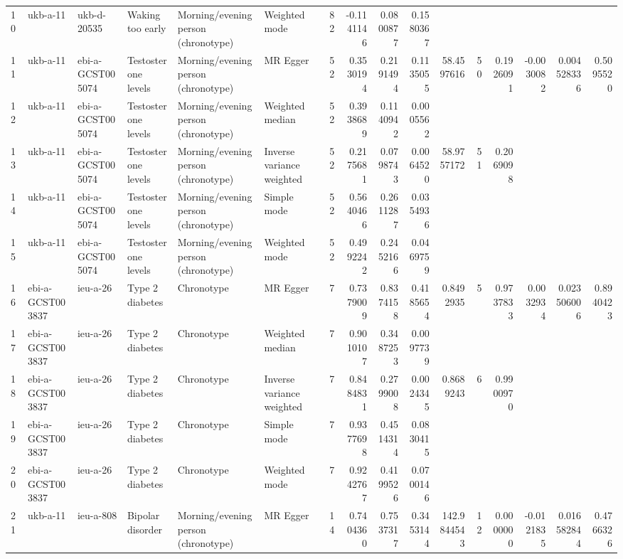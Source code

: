 \begin{table}[ht]
\begin{tabular}{llllllrrrrrrrrrr}
  10 & ukb-a-11 & ukb-d-20535 & Waking too early & Morning/evening person (chronotype) & Weighted mode & 82 & -0.1141146 & 0.0800877 & 0.1580367 &  &  &  &  &  &  \\ 
  11 & ukb-a-11 & ebi-a-GCST005074 & Testosterone levels & Morning/evening person (chronotype) & MR Egger & 52 & 0.3530194 & 0.2191494 & 0.1135055 & 58.4597616 & 50 & 0.1926091 & -0.0030082 & 0.004528336 & 0.5095520 \\ 
  12 & ukb-a-11 & ebi-a-GCST005074 & Testosterone levels & Morning/evening person (chronotype) & Weighted median & 52 & 0.3938689 & 0.1140942 & 0.0005562 &  &  &  &  &  &  \\ 
  13 & ukb-a-11 & ebi-a-GCST005074 & Testosterone levels & Morning/evening person (chronotype) & Inverse variance weighted & 52 & 0.2175681 & 0.0798743 & 0.0064520 & 58.9757172 & 51 & 0.2069098 &  &  &  \\ 
  14 & ukb-a-11 & ebi-a-GCST005074 & Testosterone levels & Morning/evening person (chronotype) & Simple mode & 52 & 0.5640466 & 0.2611287 & 0.0354936 &  &  &  &  &  &  \\ 
  15 & ukb-a-11 & ebi-a-GCST005074 & Testosterone levels & Morning/evening person (chronotype) & Weighted mode & 52 & 0.4992242 & 0.2452166 & 0.0469759 &  &  &  &  &  &  \\ 
  16 & ebi-a-GCST003837 & ieu-a-26 & Type 2 diabetes & Chronotype & MR Egger & 7 & 0.7379009 & 0.8374158 & 0.4185654 & 0.8492935 & 5 & 0.9737833 & 0.0032934 & 0.023506006 & 0.8940423 \\ 
  17 & ebi-a-GCST003837 & ieu-a-26 & Type 2 diabetes & Chronotype & Weighted median & 7 & 0.9010107 & 0.3487253 & 0.0097739 &  &  &  &  &  &  \\ 
  18 & ebi-a-GCST003837 & ieu-a-26 & Type 2 diabetes & Chronotype & Inverse variance weighted & 7 & 0.8484831 & 0.2799008 & 0.0024345 & 0.8689243 & 6 & 0.9900970 &  &  &  \\ 
  19 & ebi-a-GCST003837 & ieu-a-26 & Type 2 diabetes & Chronotype & Simple mode & 7 & 0.9377698 & 0.4514314 & 0.0830415 &  &  &  &  &  &  \\ 
  20 & ebi-a-GCST003837 & ieu-a-26 & Type 2 diabetes & Chronotype & Weighted mode & 7 & 0.9242767 & 0.4199526 & 0.0700146 &  &  &  &  &  &  \\ 
  21 & ukb-a-11 & ieu-a-808 & Bipolar disorder & Morning/evening person (chronotype) & MR Egger & 14 & 0.7404360 & 0.7537317 & 0.3453144 & 142.9844543 & 12 & 0.0000000 & -0.0121835 & 0.016582844 & 0.4766326 \\ 

\end{tabular}
\end{table}
